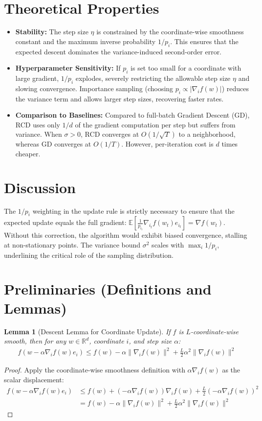 \documentclass{article}
\newtheorem{lemma}[theorem]{Lemma}
\begin{document}
\section*{Theoretical Properties}
\begin{itemize}
\item \textbf{Stability:} The step size $\eta$ is constrained by the coordinate-wise smoothness constant and the maximum inverse probability $1/p_i$. This ensures that the expected descent dominates the variance-induced second-order error.
\item \textbf{Hyperparameter Sensitivity:} If $p_i$ is set too small for a coordinate with large gradient, $1/p_i$ explodes, severely restricting the allowable step size $\eta$ and slowing convergence. Importance sampling (choosing $p_i \propto |\nabla_i f(w)|$) reduces the variance term and allows larger step sizes, recovering faster rates.
\item \textbf{Comparison to Baselines:} Compared to full-batch Gradient Descent (GD), RCD uses only $1/d$ of the gradient computation per step but suffers from variance. When $\sigma > 0$, RCD converges at $O(1/\sqrt{T})$ to a neighborhood, whereas GD converges at $O(1/T)$. However, per-iteration cost is $d$ times cheaper.
\end{itemize}

\section*{Discussion}
The $1/p_i$ weighting in the update rule is strictly necessary to ensure that the expected update equals the full gradient: $\mathbb{E}[\frac{1}{p_{i_t}} \nabla_{i_t} f(w_t) e_{i_t}] = \nabla f(w_t)$. Without this correction, the algorithm would exhibit biased convergence, stalling at non-stationary points. The variance bound $\sigma^2$ scales with $\max_i 1/p_i$, underlining the critical role of the sampling distribution.

\section*{Preliminaries (Definitions and Lemmas)}
\begin{lemma}[Descent Lemma for Coordinate Update]
If $f$ is $L$-coordinate-wise smooth, then for any $w \in \mathbb{R}^d$, coordinate $i$, and step size $\alpha$:
\begin{align*}
f(w - \alpha \nabla_i f(w) e_i) \leq f(w) - \alpha \|\nabla_i f(w)\|^2 + \frac{L}{2} \alpha^2 \|\nabla_i f(w)\|^2
\end{align*}
\end{lemma}
\begin{proof}
Apply the coordinate-wise smoothness definition with $\alpha \nabla_i f(w)$ as the scalar displacement:
\begin{align*}
f(w - \alpha \nabla_i f(w) e_i) &\leq f(w) + (-\alpha \nabla_i f(w)) \nabla_i f(w) + \frac{L}{2} (-\alpha \nabla_i f(w))^2 \\
&= f(w) - \alpha \|\nabla_i f(w)\|^2 + \frac{L}{2} \alpha^2 \|\nabla_i f(w)\|^2
\end{align*}
\end{proof}
\end{document}

